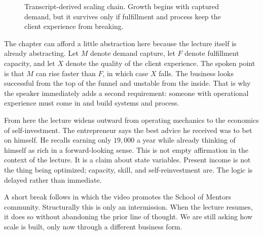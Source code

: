 \begin{figure}[h]
\centering
{}
\caption{Transcript-derived scaling chain. Growth begins with captured demand, but it survives only if fulfillment and process keep the client experience from breaking.}
\end{figure}

The chapter can afford a little abstraction here because the lecture itself is already abstracting. Let $M$ denote demand capture, let $F$ denote fulfillment capacity, and let $X$ denote the quality of the client experience. The spoken point is that $M$ can rise faster than $F$, in which case $X$ falls. The business looks successful from the top of the funnel and unstable from the inside. That is why the speaker immediately adds a second requirement: someone with operational experience must come in and build systems and process.

From here the lecture widens outward from operating mechanics to the economics of self-investment. The entrepreneur says the best advice he received was to bet on himself. He recalls earning only $19{,}000$ a year while already thinking of himself as rich in a forward-looking sense. This is not empty affirmation in the context of the lecture. It is a claim about state variables. Present income is not the thing being optimized; capacity, skill, and self-reinvestment are. The logic is delayed rather than immediate.

A short break follows in which the video promotes the School of Mentors community. Structurally this is only an intermission. When the lecture resumes, it does so without abandoning the prior line of thought. We are still asking how scale is built, only now through a different business form.

